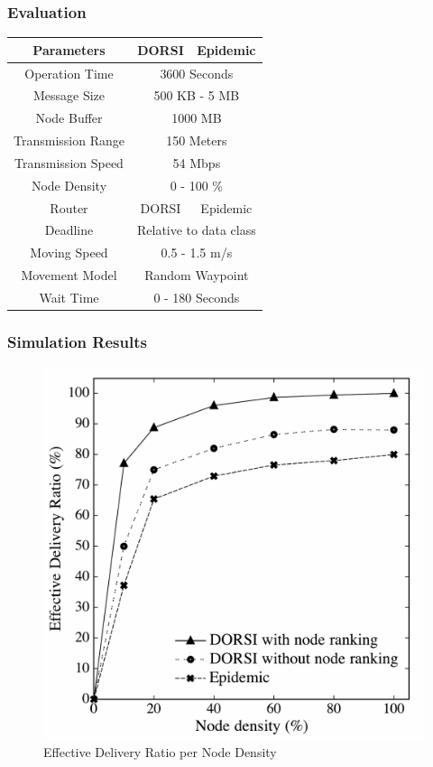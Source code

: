 \documentclass{beamer}
\begin{document}
\begin{frame}
	\frametitle{Evaluation}
	\begin{table}[!t]
		\renewcommand{\arraystretch}{1.3}
		\centering
		\begin{tabular}{|c|c|c|}
			\hline
			Parameters         & DORSI                  & Epidemic \\ \hline
			Operation Time     & \multicolumn{2}{|c|}{3600 Seconds }  \\ \hline
			Message Size       &           \multicolumn{2}{|c|}{500 KB - 5 MB}        \\ \hline
			Node Buffer        &              \multicolumn{2}{|c|}{1000 MB   }       \\ \hline
			Transmission Range &              \multicolumn{2}{|c|}{150 Meters  }        \\ \hline
			Transmission Speed &              \multicolumn{2}{|c|}{ 54 Mbps   }        \\ \hline
			Node Density       &                \multicolumn{2}{|c|}{0 - 100 \% }        \\ \hline
			Router             & DORSI                  & Epidemic \\ \hline
			Deadline                &  \multicolumn{2}{|c|}{Relative to data class}       \\ \hline
			Moving Speed       &          \multicolumn{2}{|c|}{0.5 - 1.5 m/s }        \\ \hline
			Movement Model     &       \multicolumn{2}{|c|}{Random Waypoint  }      \\ \hline
			Wait Time     &       \multicolumn{2}{|c|}{0 - 180 Seconds  }      \\ \hline
		\end{tabular}
	\end{table}
\end{frame}
\begin{frame}
	\frametitle{Simulation Results}
\begin{figure}
\centering
\includegraphics[width=0.5\linewidth]{Figures_Present/Fig4-eps-converted-to}
\caption{Effective Delivery Ratio per Node Density}
\label{fig:Fig4-eps-converted-to}
\end{figure}
\end{frame}
\end{document}
